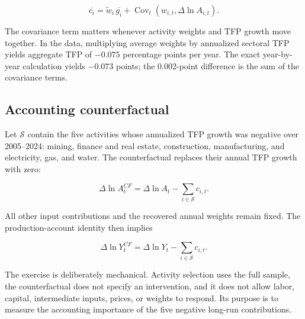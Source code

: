 \begin{equation}
\overline{c_i}
=
\widetilde{w}_i\,\overline{g_i}
+\operatorname{Cov}_t
\left(w_{i,t},\Delta\ln A_{i,t}\right).
\label{eq:covariance_decomposition}
\end{equation}

The covariance term matters whenever activity weights and TFP growth move together. In the data, multiplying average weights by annualized sectoral TFP yields aggregate TFP of $-0.075$ percentage points per year. The exact year-by-year calculation yields $-0.073$ points; the 0.002-point difference is the sum of the covariance terms.

\subsection{Accounting counterfactual}

Let \(\mathcal{S}\) contain the five activities whose annualized TFP growth was negative over 2005--2024: mining, finance and real estate, construction, manufacturing, and electricity, gas, and water. The counterfactual replaces their annual TFP growth with zero:

\begin{equation}
\Delta\ln A_t^{CF}
=
\Delta\ln A_t
-\sum_{i\in\mathcal{S}}c_{i,t}.
\label{eq:counterfactual_tfp}
\end{equation}

All other input contributions and the recovered annual weights remain fixed. The production-account identity then implies

\begin{equation}
\Delta\ln Y_t^{CF}
=
\Delta\ln Y_t
-\sum_{i\in\mathcal{S}}c_{i,t}.
\label{eq:counterfactual_output}
\end{equation}

The exercise is deliberately mechanical. Activity selection uses the full sample, the counterfactual does not specify an intervention, and it does not allow labor, capital, intermediate inputs, prices, or weights to respond. Its purpose is to measure the accounting importance of the five negative long-run contributions.
